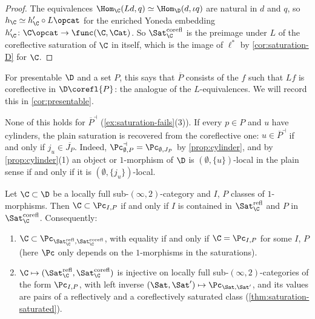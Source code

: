 \begin{proof}
The equivalences $\Hom_{\C}(Ld,q) \simeq \Hom_{\D}(d,\iota q)$ are natural in $d$ and $q$, so $h_{\C} \simeq h'_{\C} \circ L\opcat$ for the enriched Yoneda embedding $h'_{\C}\colon \C\opcat \to \func(\C,\Cat)$. So $\Sat^{\mathrm{corefl}}_{\C}$ is the preimage under $L$ of the coreflective saturation of $\C$ in itself, which is the image of $\ell^{*}$ by \cref{cor:saturation-D} for $\C$.
\end{proof}

For presentable $\D$ and a set $P$, this says that $\overline{P}$ consists of the $f$ such that $Lf$ is coreflective in $\D\corefl{P}$: the analogue of the $L$-equivalences. We will record this in \cref{cor:presentable}.

\begin{rmk}
\label{rmk:plain-vs-refl}
None of this holds for $\overline{P}^{\dashv}$ (\cref{ex:saturation-fails}(3)). If every $p \in P$ and $u$ have cylinders, the plain saturation is recovered from the coreflective one: $u \in \overline{P}^{\dashv}$ if and only if $j_{u} \in \overline{J_{P}}$. Indeed, $\Pc^{\dashv}_{\emptyset,P} = \Pc_{\emptyset,J_{P}}$ by \cref{prop:cylinder}, and by \cref{prop:cylinder}(1) an object or $1$-morphism of $\D$ is $(\emptyset,\{u\})$-local in the plain sense if and only if it is $(\emptyset,\{j_{u}\})$-local.
\end{rmk}

\begin{prop}
\label{prop:galois}
Let $\C \subset \D$ be a locally full sub-$(\infty,2)$-category and $I$, $P$ classes of $1$-morphisms. Then $\C \subset \Pc_{I,P}$ if and only if $I$ is contained in $\Sat^{\mathrm{refl}}_{\C}$ and $P$ in $\Sat^{\mathrm{corefl}}_{\C}$. Consequently:
\begin{enumerate}
\item $\C \subset \Pc_{\Sat^{\mathrm{refl}}_{\C},\Sat^{\mathrm{corefl}}_{\C}}$, with equality if and only if $\C = \Pc_{I,P}$ for some $I$, $P$ (here $\Pc$ only depends on the $1$-morphisms in the saturations).
\item $\C \mapsto (\Sat^{\mathrm{refl}}_{\C},\Sat^{\mathrm{corefl}}_{\C})$ is injective on locally full sub-$(\infty,2)$-categories of the form $\Pc_{I,P}$, with left inverse $(\Sat,\Sat') \mapsto \Pc_{\Sat,\Sat'}$, and its values are pairs of a reflectively and a coreflectively saturated class (\cref{thm:saturation-saturated}).
\end{enumerate}
\end{prop}

